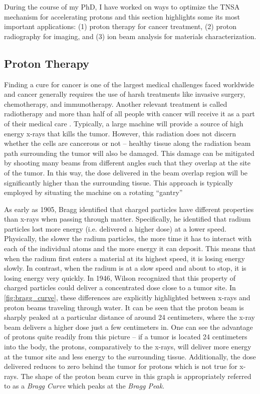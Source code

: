 During the course of my PhD, I have worked on ways to optimize the \gls{TNSA} mechanism for accelerating protons and this section highlights some its most important applications: (1) proton therapy for cancer treatment, (2) proton radiography for imaging, and (3) ion beam analysis for materials characterization.


\subsection{Proton Therapy}

Finding a cure for cancer is one of the largest medical challenges faced worldwide and cancer generally requires the use of harsh treatments like invasive surgery, chemotherapy, and immunotherapy. Another relevant treatment is called radiotherapy and more than half of all people with cancer will receive it as a part of their medical care \cite{Mayo_2024_Cancer}. Typically, a large machine will provide a source of high energy x-rays that kills the tumor. However, this radiation does not discern whether the cells are cancerous or not -- healthy tissue along the radiation beam path surrounding the tumor will also be damaged. This damage can be mitigated by shooting many beams from different angles such that they overlap at the site of the tumor. In this way, the dose delivered in the beam overlap region will be significantly higher than the surrounding tissue. This approach is typically employed by situating the machine on a rotating ``gantry''

As early as 1905, Bragg \cite{Bragg_1905_JOS} identified that charged particles have different properties than x-rays when passing through matter. Specifically, he identified that radium particles lost more energy (i.e. delivered a higher dose) at a lower speed. Physically, the slower the radium particles, the more time it has to interact with each of the individual atoms and the more energy it can deposit. This means that when the radium first enters a material at its highest speed, it is losing energy slowly. In contrast, when the radium is at a slow speed and about to stop, it is losing energy very quickly. In 1946, Wilson \cite{Wilson_1946_Rad} recognized that this property of charged particles could deliver a concentrated dose close to a tumor site. In \autoref{fig:bragg_curve}, these differences are explicitly highlighted between x-rays and proton beams traveling through water. It can be seen that the proton beam is sharply peaked at a particular distance of around 24 centimeters, where the x-ray beam delivers a higher dose just a few centimeters in. One can see the advantage of protons quite readily from this picture -- if a tumor is located 24 centimeters into the body, the protons, comparatively to the x-rays, will deliver more energy at the tumor site and less energy to the surrounding tissue. Additionally, the dose delivered reduces to zero behind the tumor for protons which is not true for x-rays. The shape of the proton beam curve in this graph is appropriately referred to as a \emph{Bragg Curve} which peaks at the \emph{Bragg Peak}. 

